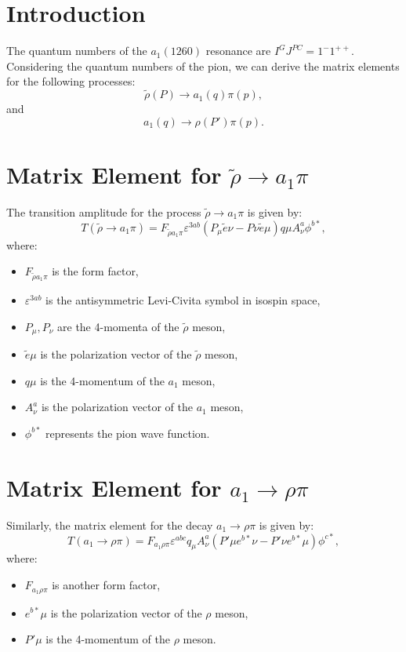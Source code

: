 \documentclass[12pt]{article}
\begin{document}


\section{Introduction}
The quantum numbers of the $a_1(1260)$ resonance are $I^G J^{PC} = 1^{-}1^{++}$. Considering the quantum numbers of the pion, we can derive the matrix elements for the following processes:
\begin{equation}
\tilde{\rho}(P) \to a_1(q)\pi(p),
\end{equation}
and
\begin{equation}
a_1(q) \to \rho(P')\pi(p).
\end{equation}

\section{Matrix Element for $\tilde{\rho} \to a_1\pi$}
The transition amplitude for the process $\tilde{\rho} \to a_1\pi$ is given by:
\begin{equation}
T(\tilde{\rho} \to a_1\pi) = F_{\tilde{\rho} a_1 \pi} \varepsilon^{3ab} (P_\mu \tilde{e}\nu - P\nu \tilde{e}\mu) q\mu A^a_\nu \phi^{b*},
\end{equation}
where:
\begin{itemize}
\item $F_{\tilde{\rho} a_1 \pi}$ is the form factor,
\item $\varepsilon^{3ab}$ is the antisymmetric Levi-Civita symbol in isospin space,
\item $P_\mu, P_\nu$ are the 4-momenta of the $\tilde{\rho}$ meson,
\item $\tilde{e}\mu$ is the polarization vector of the $\tilde{\rho}$ meson,
\item $q\mu$ is the 4-momentum of the $a_1$ meson,
\item $A^a_\nu$ is the polarization vector of the $a_1$ meson,
\item $\phi^{b*}$ represents the pion wave function.
\end{itemize}

\section{Matrix Element for $a_1 \to \rho\pi$}
Similarly, the matrix element for the decay $a_1 \to \rho\pi$ is given by:
\begin{equation}
T(a_1 \to \rho\pi) = F_{a_1 \rho \pi} \varepsilon^{abc} q_\mu A^a_\nu (P'\mu e^{b*}\nu - P'\nu e^{b*}\mu) \phi^{c*},
\end{equation}
where:
\begin{itemize}
\item $F_{a_1 \rho \pi}$ is another form factor,
\item $e^{b*}\mu$ is the polarization vector of the $\rho$ meson,
\item $P'\mu$ is the 4-momentum of the $\rho$ meson.
\end{itemize}
\end{document}
